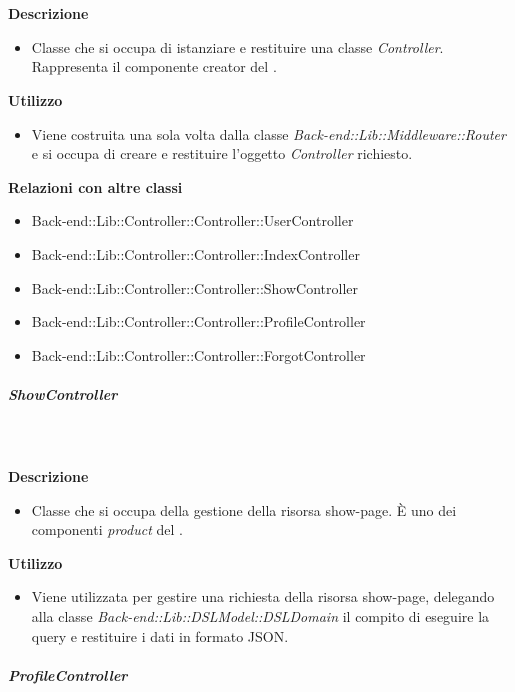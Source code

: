 				\textbf{\\ \\ Descrizione} 
					\begin{itemize}
						\item[] Classe che si occupa di istanziare e restituire una classe \textit{Controller}. Rappresenta il componente creator del  .
					\end{itemize}      
				\textbf{Utilizzo}  
					\begin{itemize}
						\item[] Viene costruita una sola volta dalla classe \textit{Back-end::Lib::Middleware::Router} e si occupa di creare e restituire l'oggetto \textit{Controller} richiesto.
					\end{itemize}
					\textbf{Relazioni con altre classi}
					\begin{itemize}
							\item{Back-end::Lib::Controller::Controller::UserController}
							\item{Back-end::Lib::Controller::Controller::IndexController}
							\item{Back-end::Lib::Controller::Controller::ShowController}
							\item{Back-end::Lib::Controller::Controller::ProfileController}
							\item{Back-end::Lib::Controller::Controller::ForgotController}
					\end{itemize}
			\subparagraph{ShowController}
				
				\textbf{\\ \\ Descrizione} 
					\begin{itemize}
						\item[] Classe che si occupa della gestione della risorsa show-page. È uno dei componenti \textit{product} del  .
					\end{itemize}      
				\textbf{Utilizzo}  
					\begin{itemize}
						\item[] Viene utilizzata per gestire una richiesta della risorsa show-page, delegando alla classe \textit{Back-end::Lib::DSLModel::DSLDomain} il compito di eseguire la query e restituire i dati in formato JSON.
					\end{itemize}
			\subparagraph{ProfileController}
				

